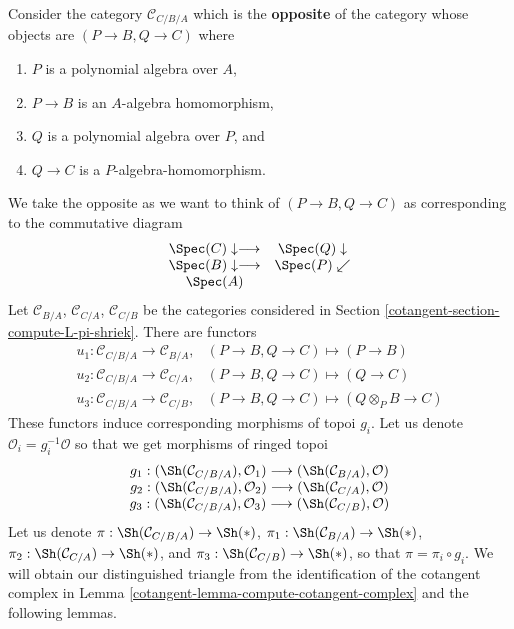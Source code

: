 \medskip\noindent
Consider the category $\mathcal{C}_{C/B/A}$
which is the {\bf opposite} of the category whose objects are
$(P \to B, Q \to C)$ where
\begin{enumerate}
\item $P$ is a polynomial algebra over $A$,
\item $P \to B$ is an $A$-algebra homomorphism,
\item $Q$ is a polynomial algebra over $P$, and
\item $Q \to C$ is a $P$-algebra-homomorphism.
\end{enumerate}
We take the opposite as we want to think of $(P \to B, Q \to C)$
as corresponding to the commutative diagram
$$
\begin{array}{cc}\Spec(C) \downarrow\longrightarrow & \Spec(Q) \downarrow \\ \Spec(B) \downarrow\longrightarrow & \Spec(P) \swarrow \\ \Spec(A) & \end{array}
$$
Let $\mathcal{C}_{B/A}$, $\mathcal{C}_{C/A}$, $\mathcal{C}_{C/B}$
be the categories considered in Section \ref{cotangent-section-compute-L-pi-shriek}.
There are functors
$$
\begin{matrix}
u_1 : \mathcal{C}_{C/B/A} \to \mathcal{C}_{B/A}, &
(P \to B, Q \to C) \mapsto (P \to B) \\
u_2 : \mathcal{C}_{C/B/A} \to \mathcal{C}_{C/A}, &
(P \to B, Q \to C) \mapsto (Q \to C) \\
u_3 : \mathcal{C}_{C/B/A} \to \mathcal{C}_{C/B}, &
(P \to B, Q \to C) \mapsto (Q \otimes_P B \to C)
\end{matrix}
$$
These functors induce corresponding morphisms of topoi $g_i$.
Let us denote $\mathcal{O}_i = g_i^{-1}\mathcal{O}$ so that we
get morphisms of ringed topoi
\begin{equation}
\label{equation-three-maps}
\begin{matrix}
g_1 : (\Sh(\mathcal{C}_{C/B/A}), \mathcal{O}_1)
\longrightarrow (\Sh(\mathcal{C}_{B/A}), \mathcal{O}) \\
g_2 : (\Sh(\mathcal{C}_{C/B/A}), \mathcal{O}_2)
\longrightarrow (\Sh(\mathcal{C}_{C/A}), \mathcal{O}) \\
g_3 : (\Sh(\mathcal{C}_{C/B/A}), \mathcal{O}_3)
\longrightarrow (\Sh(\mathcal{C}_{C/B}), \mathcal{O})
\end{matrix}
\end{equation}
Let us denote
$\pi : \Sh(\mathcal{C}_{C/B/A}) \to \Sh(*)$,
$\pi_1 : \Sh(\mathcal{C}_{B/A}) \to \Sh(*)$,
$\pi_2 : \Sh(\mathcal{C}_{C/A}) \to \Sh(*)$, and
$\pi_3 : \Sh(\mathcal{C}_{C/B}) \to \Sh(*)$,
so that $\pi = \pi_i \circ g_i$.
We will obtain our distinguished triangle from the identification
of the cotangent complex in Lemma \ref{cotangent-lemma-compute-cotangent-complex}
and the following lemmas.

